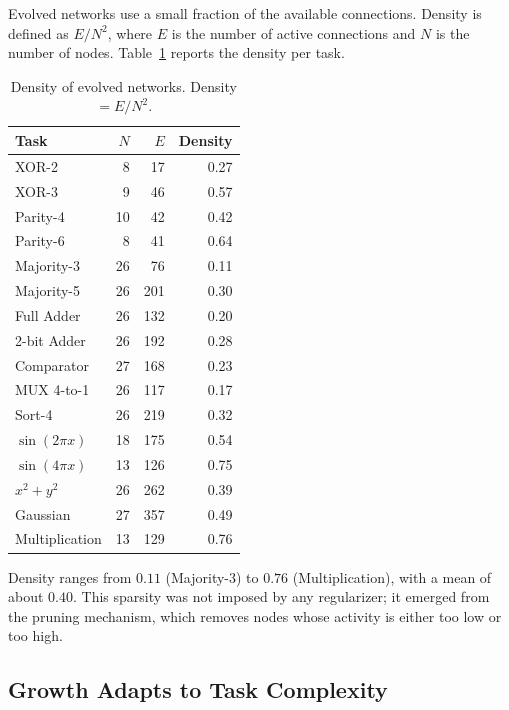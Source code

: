 Evolved networks use a small fraction of the available connections.
Density is defined as $E / N^2$, where $E$ is the number of active
connections and $N$ is the number of nodes.
Table~\ref{tab:density} reports the density per task.

\begin{table}[h]
  \centering
  \small
  \caption{Density of evolved networks. Density $= E / N^2$.}
  \label{tab:density}
  \begin{tabular}{lrrr}
    \toprule
    \textbf{Task} & $N$ & $E$ & \textbf{Density} \\
    \midrule
    XOR-2          &  8 &  17 & 0.27 \\
    XOR-3          &  9 &  46 & 0.57 \\
    Parity-4       & 10 &  42 & 0.42 \\
    Parity-6       &  8 &  41 & 0.64 \\
    Majority-3     & 26 &  76 & 0.11 \\
    Majority-5     & 26 & 201 & 0.30 \\
    Full Adder     & 26 & 132 & 0.20 \\
    2-bit Adder    & 26 & 192 & 0.28 \\
    Comparator     & 27 & 168 & 0.23 \\
    MUX 4-to-1     & 26 & 117 & 0.17 \\
    Sort-4         & 26 & 219 & 0.32 \\
    \midrule
    $\sin(2\pi x)$ & 18 & 175 & 0.54 \\
    $\sin(4\pi x)$ & 13 & 126 & 0.75 \\
    $x^2 + y^2$    & 26 & 262 & 0.39 \\
    Gaussian       & 27 & 357 & 0.49 \\
    Multiplication & 13 & 129 & 0.76 \\
    \bottomrule
  \end{tabular}
\end{table}

Density ranges from $0.11$ (Majority-3) to $0.76$ (Multiplication),
with a mean of about $0.40$. This sparsity was not imposed by any
regularizer; it emerged from the pruning mechanism, which removes
nodes whose activity is either too low or too high.

\subsection{Growth Adapts to Task Complexity}
\label{sec:results-growth}

